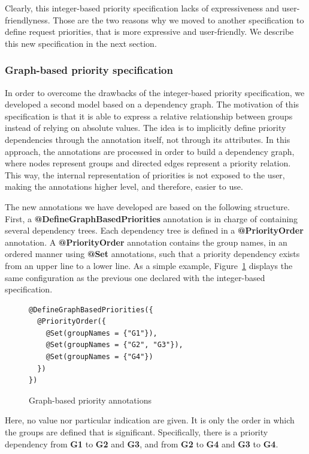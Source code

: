 \documentclass[11pt]{report}
\begin{document}
Clearly, this integer-based priority specification lacks of expressiveness and user-friendlyness. Those are the two reasons why we moved to another specification to define request priorities, that is more expressive and user-friendly. We describe this new specification in the next section.
 
\subsubsection{Graph-based priority specification}
In order to overcome the drawbacks of the integer-based priority specification, we developed a second model based on a dependency graph. The motivation of this specification is that it is able to express a relative relationship between groups instead of relying on absolute values. The idea is to implicitly define priority dependencies through the annotation itself, not through its attributes. In this approach, the annotations are processed in order to build a dependency graph, where nodes represent groups and directed edges represent a priority relation. This way, the internal representation of priorities is not exposed to the user, making the annotations higher level, and therefore, easier to use.

The new annotations we have developed are based on the following structure. First, a \textbf{@DefineGraphBasedPriorities} annotation is in charge of containing several dependency trees. Each dependency tree is defined in a \textbf{@PriorityOrder} annotation. A \textbf{@PriorityOrder} annotation contains the group names, in an ordered manner using \textbf{@Set} annotations, such that a priority dependency exists from an upper line to a lower line. As a simple example, Figure~\ref{graph_priority_annotation} displays the same configuration as the previous one declared with the integer-based specification.

\begin{figure}[!ht]
	\lstset{language=java, numbers=left, numberstyle=\tiny, stepnumber=1, numbersep=5pt, basicstyle=\footnotesize}
	\begin{lstlisting}[frame=single]
@DefineGraphBasedPriorities({
  @PriorityOrder({
    @Set(groupNames = {"G1"}),
    @Set(groupNames = {"G2", "G3"}),
    @Set(groupNames = {"G4"})
  })
})
 	\end{lstlisting}
\caption{Graph-based priority annotations}
\label{graph_priority_annotation}
\end{figure}

Here, no value nor particular indication are given. It is only the order in which the groups are defined that is significant. Specifically, there is a priority dependency from \textbf{G1} to \textbf{G2} and \textbf{G3}, and from \textbf{G2} to \textbf{G4} and \textbf{G3} to \textbf{G4}.
\end{document}
